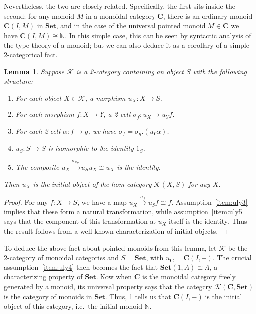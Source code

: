 \documentclass{article}
\newtheorem{lem}[thm]{Lemma}
\theoremstyle{definition}
\theoremstyle{remark}
\def\sK{\mathscr{K}}
\def\Set{\mathbf{Set}}
\let\xto\xrightarrow
\def\bC{\ensuremath{\mathbf{C}}\xspace}
\begin{document}
Nevertheless, the two are closely related.
Specifically, the first sits inside the second: for any monoid $M$ in a monoidal category $\bC$, there is an ordinary monoid $\bC(I,M)$ in $\Set$, and in the case of the universal pointed monoid $M\in \bC$ we have $\bC(I,M)\cong \mathbb{N}$.
In this simple case, this can be seen by syntactic analysis of the type theory of a monoid; but we can also deduce it as a corollary of a simple 2-categorical fact.

\begin{lem}\label{thm:uly-initial}
  Suppose $\sK$ is a 2-category containing an object $S$ with the following structure:
  \begin{enumerate}
  \item For each object $X\in \sK$, a morphism $u_X:X\to S$.
  \item For each morphism $f:X\to Y$, a 2-cell $\sigma_f : u_X \to u_Y f$.
  \item For each 2-cell $\alpha :f\to g$, we have $\sigma_f = \sigma_g . (u_Y\alpha)$.\label{item:uly3}
  \item $u_S:S\to S$ is isomorphic to the identity $1_S$.\label{item:uly4}
  \item The composite $u_X \xto{\sigma_{u_X}} u_S u_X \cong u_X$ is the identity.\label{item:uly5}
  \end{enumerate}
  Then $u_X$ is the initial object of the hom-category $\sK(X,S)$ for any $X$.
\end{lem}
\begin{proof}
  For any $f:X\to S$, we have a map $u_X \xto{\sigma_f} u_S f \cong f$.
  Assumption~\ref{item:uly3} implies that these form a natural transformation, while assumption~\ref{item:uly5} says that the component of this transformation at $u_X$ itself is the identity.
  Thus the result follows from a well-known characterization of initial objects.
\end{proof}

To deduce the above fact about pointed monoids from this lemma, let $\sK$ be the 2-category of monoidal categories and $S=\Set$, with $u_{\bC} = \bC(I,-)$.
The crucial assumption~\ref{item:uly4} then becomes the fact that $\Set(1,A) \cong A$, a characterizing property of $\Set$.
Now when $\bC$ is the monoidal category freely generated by a monoid, its universal property says that the category $\sK(\bC,\Set)$ is the category of monoids in $\Set$.
Thus, \cref{thm:uly-initial} tells us that $\bC(I,-)$ is the initial object of this category, i.e.\ the initial monoid $\mathbb{N}$.
\end{document}
